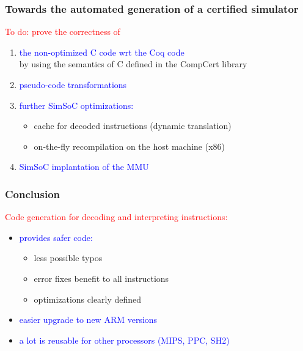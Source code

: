 \documentclass{beamer}
\newenvironment{f}[1]{\begin{frame}\frametitle{#1}}{\end{frame}}
\renewenvironment{i}{\begin{itemize}}{\end{itemize}}
\newenvironment{e}{\begin{enumerate}}{\end{enumerate}}
\newcommand\red{\textcolor{red}}
\newcommand\blue{\textcolor{blue}}
\begin{document}

\begin{f}{Towards the automated generation of a certified simulator}

\red{To do: prove the correctness of}

\begin{e}\itemsep+3mm\setcounter{enumi}{3}
\item
\blue{the non-optimized C code wrt the Coq code}\\by using
the semantics of C defined in the CompCert library
\item
\blue{pseudo-code transformations}
\item
\blue{further SimSoC optimizations:}
\begin{i}
\item cache for decoded instructions (dynamic translation)
\item on-the-fly recompilation on the host machine (x86)
\end{i}
\item
\blue{SimSoC implantation of the MMU}
\end{e}

\end{f}


\begin{f}{Conclusion}

\red{Code generation for decoding and interpreting instructions:}

\begin{i}
\item \blue{provides safer code:}
\begin{i}
\item less possible typos
\item error fixes benefit to all instructions
\item optimizations clearly defined
\end{i}
\item \blue{easier upgrade to new ARM versions}
\item \blue{a lot is reusable for other processors (MIPS, PPC, SH2)}
\end{i}

\end{f}
\end{document}
